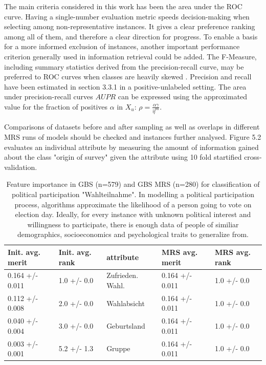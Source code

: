 The main criteria considered in this work has been the area under the ROC curve. Having a single-number evaluation metric speeds decision-making when selecting among non-representative instances. It gives a clear preference ranking among all of them, and therefore a clear direction for progress. To enable a basis for a more informed exclusion of instances, another important performance criterion generally used in information retrieval could be added. The F-Measure, including summary statistics derived from the precision-recall curve, may be preferred to ROC curves when classes are heavily skewed \cite{jesse}. Precision and recall have been estimated in section 3.3.1 in a positive-unlabeled setting. The area under precision-recall curves \(AUPR\) can be expressed using the approximated value for the fraction of positives \(\alpha\) in \(X_u\): \(\rho = \frac{\alpha \gamma}{\hat{\eta}^{pu}}\).

Comparisons of datasets before and after sampling as well as overlaps in different MRS runs of models should be checked and instances further analysed. Figure 5.2 evaluates an individual attribute by measuring the amount of information gained about the class "origin of survey" given the attribute using 10 fold startified cross-validation.

\begin{table}[!htb]
      \centering
        \begin{tabular}{lllll}
           Init. avg. merit  & Init. avg. rank &  attribute & MRS avg. merit & MRS avg. rank\\
\hline \hline
	0.164 +/- 0.011 & 1.0 +/- 0.0 & Zufrieden. Wahl. & 0.164 +/- 0.011 & 1.0 +/- 0.0 \\
	0.112 +/- 0.008 & 2.0 +/- 0.0 & Wahlabsicht & 0.164 +/- 0.011 & 1.0 +/- 0.0 \\
	0.040 +/- 0.004 & 3.0 +/- 0.0 & Geburtsland & 0.164 +/- 0.011 & 1.0 +/- 0.0 \\
	0.003 +/- 0.001 & 5.2 +/- 1.3 & Gruppe & 0.164 +/- 0.011 & 1.0 +/- 0.0 \\
        \end{tabular}
\caption{Feature importance in GBS (n=579) and GBS MRS (n=280) for classification of political participation "Wahlteilnahme". In modelling a political participation process, algorithms approximate the likelihood of a person going to vote on election day. Ideally, for every instance with unknown political interest and willingness to participate, there is enough data of people of similiar demographics, socioeconomics and psychological traits to generalize from.}
\end{table}